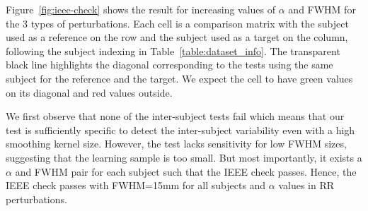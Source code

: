 \documentclass{article}
\begin{document}
Figure~\ref{fig:ieee-check} shows the result for increasing values of $\alpha$ and FWHM for the 3 types of perturbations. Each cell is a comparison matrix with the subject used as a reference on the row and the subject used as a target on the column, following the subject indexing in Table~\ref{table:dataset_info}. The transparent black line highlights the diagonal corresponding to the tests using the same subject for the reference and the target. We expect the cell to have green values on its diagonal and red values outside.

We first observe that none of the inter-subject tests fail which means that our test is sufficiently specific to detect the inter-subject variability even with a high smoothing kernel size. However, the test lacks sensitivity for low FWHM sizes, suggesting that the learning sample is too small. But most importantly, it exists a $\alpha$ and FWHM pair for each subject such that the IEEE check passes. Hence, the IEEE check passes with FWHM=15mm for all subjects and $\alpha$ values in RR perturbations.
\end{document}
